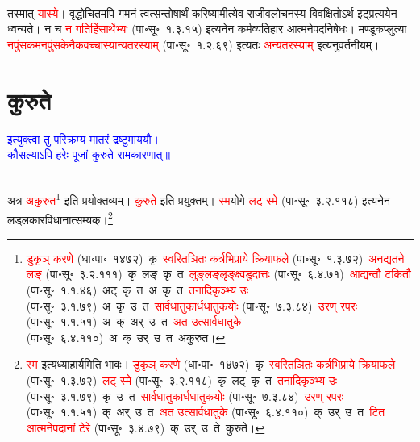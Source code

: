 \\
\fontsize{14}{21}\selectfont\begin{sloppypar}\justifying\noindent तस्मात् \textcolor{red}{यास्ये}। वृद्धोचितमपि गमनं त्वत्सन्तोषार्थं करिष्यामीत्येव राजीव\-लोचनस्य विवक्षितोऽर्थ इट्प्रत्ययेन ध्वन्यते। न च \textcolor{red}{न गति\-हिंसार्थेभ्यः} (पा॰सू॰~१.३.१५) इत्यनेन कर्मव्यतिहार आत्मनेपद\-निषेधः। मण्डूक\-प्लुत्या \textcolor{red}{नपुंसकमनपुंसकेनैक\-वच्चास्यान्यतरस्याम्} (पा॰सू॰~१.२.६९) इत्यतः \textcolor{red}{अन्यतरस्याम्} इत्यनुवर्तनीयम्।\end{sloppypar}
\section[कुरुते]{कुरुते}
\centering\textcolor{blue}{इत्युक्त्वा तु परिक्रम्य मातरं द्रष्टुमाययौ।\nopagebreak\\
कौसल्याऽपि हरेः पूजां कुरुते रामकारणात्॥}\nopagebreak\\
\\
\fontsize{14}{21}\selectfont\begin{sloppypar}\justifying\noindent\hspace{10mm} अत्र \textcolor{red}{अकुरुत}\footnote{\textcolor{red}{डुकृञ् करणे} (धा॰पा॰~१४७२)~\arrow कृ~\arrow \textcolor{red}{स्वरितञितः कर्त्रभिप्राये क्रियाफले} (पा॰सू॰~१.३.७२)~\arrow \textcolor{red}{अनद्यतने लङ्} (पा॰सू॰~३.२.१११)~\arrow कृ~लङ्~\arrow कृ~त~\arrow \textcolor{red}{लुङ्लङ्लृङ्क्ष्वडुदात्तः} (पा॰सू॰~६.४.७१)~\arrow \textcolor{red}{आद्यन्तौ टकितौ} (पा॰सू॰~१.१.४६)~\arrow अट्~कृ~त~\arrow अ~कृ~त~\arrow \textcolor{red}{तनादि\-कृञ्भ्य उः} (पा॰सू॰~३.१.७९)~\arrow अ~कृ~उ~त~\arrow \textcolor{red}{सार्वधातुकार्ध\-धातुकयोः} (पा॰सू॰~७.३.८४)~\arrow \textcolor{red}{उरण् रपरः} (पा॰सू॰~१.१.५१)~\arrow अ~क्~अर्~उ~त~\arrow \textcolor{red}{अत उत्सार्वधातुके} (पा॰सू॰~६.४.११०)~\arrow अ~क्~उर्~उ~त~\arrow अकुरुत।} इति प्रयोक्तव्यम्। \textcolor{red}{कुरुते} इति प्रयुक्तम्। \textcolor{red}{स्म}\-योगे \textcolor{red}{लट् स्मे} (पा॰सू॰~३.२.११८) इत्यनेन लड्लकार\-विधानात्सम्यक्।\footnote{\textcolor{red}{स्म} इत्यध्याहार्यमिति भावः। \textcolor{red}{डुकृञ् करणे} (धा॰पा॰~१४७२)~\arrow कृ~\arrow \textcolor{red}{स्वरितञितः कर्त्रभिप्राये क्रियाफले} (पा॰सू॰~१.३.७२)~\arrow \textcolor{red}{लट् स्मे} (पा॰सू॰~३.२.११८)~\arrow कृ~लट्~\arrow कृ~त~\arrow \textcolor{red}{तनादि\-कृञ्भ्य उः} (पा॰सू॰~३.१.७९)~\arrow कृ~उ~त~\arrow \textcolor{red}{सार्वधातुकार्ध\-धातुकयोः} (पा॰सू॰~७.३.८४)~\arrow \textcolor{red}{उरण् रपरः} (पा॰सू॰~१.१.५१)~\arrow क्~अर्~उ~त~\arrow \textcolor{red}{अत उत्सार्वधातुके} (पा॰सू॰~६.४.११०)~\arrow क्~उर्~उ~त~\arrow \textcolor{red}{टित आत्मनेपदानां टेरे} (पा॰सू॰~३.४.७९)~\arrow क्~उर्~उ~ते~\arrow कुरुते।}\end{sloppypar}
